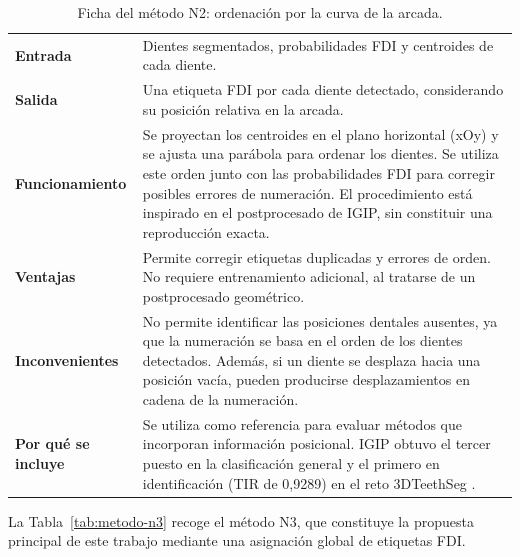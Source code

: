 \begin{table}[htbp]
    \centering
    \begin{tabular}{p{} >{\raggedright\arraybackslash}p{}}
        \hline
         \textbf{Entrada} &  
         Dientes segmentados, probabilidades FDI y centroides de cada diente. \\
         
         \textbf{Salida} &
         Una etiqueta FDI por cada diente detectado, considerando su posición relativa en la arcada. \\

         \textbf{Funcionamiento} &
         Se proyectan los centroides en el plano horizontal (xOy) y se ajusta una parábola para ordenar los dientes. Se utiliza este orden junto con las probabilidades FDI para corregir posibles errores de numeración. El procedimiento está inspirado en el postprocesado de IGIP, sin constituir una reproducción exacta. \\

         \textbf{Ventajas} &
         Permite corregir etiquetas duplicadas y errores de orden. No requiere entrenamiento adicional, al tratarse de un postprocesado geométrico. \\

         \textbf{Inconvenientes} &
         No permite identificar las posiciones dentales ausentes, ya que la numeración se basa en el orden de los dientes detectados. Además, si un diente se desplaza hacia una posición vacía, pueden producirse desplazamientos en cadena de la numeración. \\

         \textbf{Por qué se incluye} &
         Se utiliza como referencia para evaluar métodos que incorporan información posicional. IGIP obtuvo el tercer puesto en la clasificación general y el primero en identificación (TIR de 0{,}9289) en el reto 3DTeethSeg \cite{ben-hamadou3DTeethSeg223DTeeth2023}. \\
         \hline
    \end{tabular} 
    \caption{Ficha del método N2: ordenación por la curva de la arcada.}
    \label{tab:metodo-n2}
\end{table}

La Tabla~\ref{tab:metodo-n3} recoge el método N3, que constituye la propuesta principal de este trabajo mediante una asignación global de etiquetas FDI.

